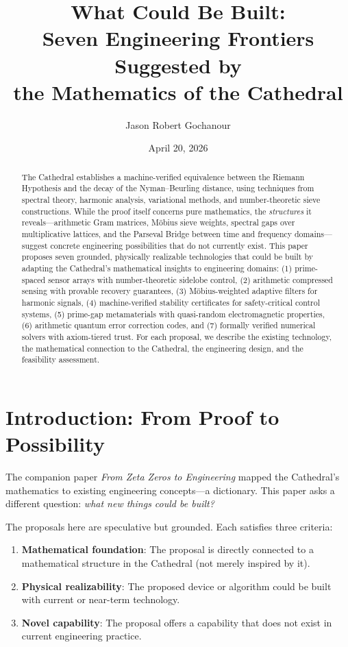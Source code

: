 \documentclass[11pt,a4paper]{article}
\title{%
  What Could Be Built:\\
  Seven Engineering Frontiers Suggested by\\
  the Mathematics of the Cathedral%
}
\author{
  Jason Robert Gochanour
}
\date{April 20, 2026}
\begin{document}
\maketitle

\begin{abstract}
The Cathedral establishes a machine-verified equivalence between
the Riemann Hypothesis and the decay of the Nyman--Beurling
distance, using techniques from spectral theory, harmonic analysis,
variational methods, and number-theoretic sieve constructions.
While the proof itself concerns pure mathematics, the
\emph{structures} it reveals---arithmetic Gram matrices, M\"obius
sieve weights, spectral gaps over multiplicative lattices, and the
Parseval Bridge between time and frequency domains---suggest
concrete engineering possibilities that do not currently exist.
This paper proposes seven grounded, physically realizable
technologies that could be built by adapting the Cathedral's
mathematical insights to engineering domains: (1) prime-spaced
sensor arrays with number-theoretic sidelobe control, (2) arithmetic
compressed sensing with provable recovery guarantees,
(3) M\"obius-weighted adaptive filters for harmonic signals,
(4) machine-verified stability certificates for safety-critical
control systems, (5) prime-gap metamaterials with quasi-random
electromagnetic properties, (6) arithmetic quantum error correction
codes, and (7) formally verified numerical solvers with axiom-tiered
trust. For each proposal, we describe the existing technology, the
mathematical connection to the Cathedral, the engineering design,
and the feasibility assessment.
\end{abstract}

\tableofcontents

\section{Introduction: From Proof to Possibility}

The companion paper \emph{From Zeta Zeros to Engineering} mapped
the Cathedral's mathematics to existing engineering concepts---a
dictionary. This paper asks a different question: \emph{what new
things could be built?}

The proposals here are speculative but grounded. Each satisfies
three criteria:

\begin{enumerate}
  \item \textbf{Mathematical foundation}: The proposal is directly
    connected to a mathematical structure in the Cathedral (not
    merely inspired by it).
  \item \textbf{Physical realizability}: The proposed device or
    algorithm could be built with current or near-term technology.
  \item \textbf{Novel capability}: The proposal offers a capability
    that does not exist in current engineering practice.
\end{enumerate}
\end{document}
